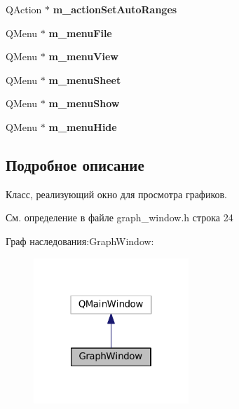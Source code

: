 \begin{DoxyCompactItemize}
\item 
\hypertarget{class_graph_window_add86d9623399b3aaace9c961c2c56d9f}{}\label{class_graph_window_add86d9623399b3aaace9c961c2c56d9f} 
Q\+Action $\ast$ {\bfseries m\+\_\+action\+Set\+Auto\+Ranges}
\item 
\hypertarget{class_graph_window_a2cfe856a0c10dfffb05e4a568d135feb}{}\label{class_graph_window_a2cfe856a0c10dfffb05e4a568d135feb} 
Q\+Menu $\ast$ {\bfseries m\+\_\+menu\+File}
\item 
\hypertarget{class_graph_window_a3e2ffe57452e156a0d62fb82da8ed868}{}\label{class_graph_window_a3e2ffe57452e156a0d62fb82da8ed868} 
Q\+Menu $\ast$ {\bfseries m\+\_\+menu\+View}
\item 
\hypertarget{class_graph_window_ae3c17a4c2fc6e3f935dc3b3f7cc89974}{}\label{class_graph_window_ae3c17a4c2fc6e3f935dc3b3f7cc89974} 
Q\+Menu $\ast$ {\bfseries m\+\_\+menu\+Sheet}
\item 
\hypertarget{class_graph_window_a4078c2f892ffb57912412fb0c38af5ba}{}\label{class_graph_window_a4078c2f892ffb57912412fb0c38af5ba} 
Q\+Menu $\ast$ {\bfseries m\+\_\+menu\+Show}
\item 
\hypertarget{class_graph_window_a2df057f6b70c12d9190a456a7f62b9c4}{}\label{class_graph_window_a2df057f6b70c12d9190a456a7f62b9c4} 
Q\+Menu $\ast$ {\bfseries m\+\_\+menu\+Hide}
\end{DoxyCompactItemize}


\subsection{Подробное описание}
Класс, реализующий окно для просмотра графиков. 

См. определение в файле graph\+\_\+window.\+h строка 24



Граф наследования\+:Graph\+Window\+:
\nopagebreak
\begin{figure}[H]
\begin{center}
\leavevmode
\includegraphics[width=166pt]{class_graph_window__inherit__graph}
\end{center}
\end{figure}


